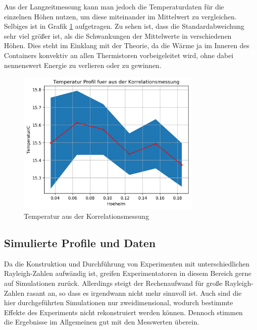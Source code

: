 \documentclass[12pt,a4paper,titlepage,headinclude]{scrartcl}
\numberwithin{equation}{subsection}
\begin{document}
Aus der Langzeitmessung kann man jedoch die Temperaturdaten für die einzelnen Höhen nutzen, um diese miteinander im Mittelwert zu vergleichen.
Selbiges ist in Grafik \ref{fig:T_kor} aufgetragen.
Zu sehen ist, dass die Standardabweichung sehr viel größer ist, als die Schwankungen der Mittelwerte in verschiedenen Höhen.
Dies steht im Einklang mit der Theorie, da die Wärme ja im Inneren des Containers konvektiv an allen Thermistoren vorbeigeleitet wird, ohne dabei nennenswert Energie zu verlieren oder zu gewinnen.
\begin{figure}[!ht]
\centering
\includegraphics[width=0.8\textwidth]{T_kor}
\caption{Temperatur aus der Korrelationsmessung}
\label{fig:T_kor}
\end{figure}





\subsection{Simulierte Profile und Daten}
\label{sec:simulation}
Da die Konstruktion und Durchführung von Experimenten mit unterschiedlichen Rayleigh-Zahlen aufwändig ist, greifen Experimentatoren in diesem Bereich gerne auf Simulationen zurück.
Allerdings steigt der Rechenaufwand für große Rayleigh-Zahlen rasant an, so dass es irgendwann nicht mehr sinnvoll ist.
Auch sind die hier durchgeführten Simulationen nur zweidimensional, wodurch bestimmte Effekte des Experiments nicht rekonstruiert werden können.
Dennoch stimmen die Ergebnisse im Allgemeinen gut mit den Messwerten überein.\\
\end{document}
